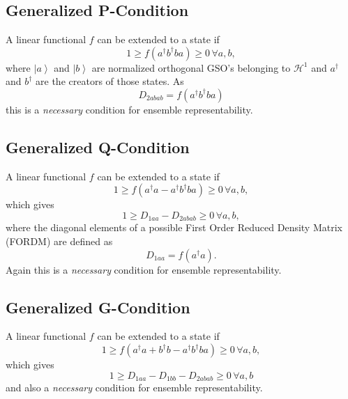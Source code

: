 \documentclass[aps,preprint]{revtex4}%
\begin{document}
\subsection{Generalized P-Condition}

A linear functional $f$ can be extended to a state if
\begin{equation}
1\geq f\left(  a^{\dagger}b^{\dagger}ba\right)  \geq0\,\forall a,b,
\end{equation}
where $\left\vert a\right\rangle $ and $\left\vert b\right\rangle $ are
normalized orthogonal GSO's belonging to $\mathcal{H}^{1}$ and $a^{\dagger}$
and $b^{\dagger}$ are the creators of those states. As
\begin{equation}
D_{2abab}=f\left(  a^{\dagger}b^{\dagger}ba\right)
\end{equation}
this is a \emph{necessary }condition for ensemble representability.

\subsection{Generalized Q-Condition}

A linear functional $f$ can be extended to a state if
\begin{equation}
1\geq f\left(  a^{\dagger}a-a^{\dagger}b^{\dagger}ba\right)  \geq0\,\forall
a,b,
\end{equation}
which gives
\begin{equation}
1\geq D_{1aa}-D_{2abab}\geq0\,\forall a,b, \label{Q1}%
\end{equation}
where the diagonal elements of a possible First Order Reduced Density Matrix
(FORDM) are defined as
\begin{equation}
D_{1aa}=f\left(  a^{\dagger}a\right)  .
\end{equation}
Again this is a \emph{necessary }condition for ensemble representability.

\subsection{Generalized G-Condition}

A linear functional $f$ can be extended to a state if
\begin{equation}
1\geq f\left(  a^{\dagger}a+b^{\dagger}b-a^{\dagger}b^{\dagger}ba\right)
\geq0\,\forall a,b,
\end{equation}
which gives
\begin{equation}
1\geq D_{1aa}-D_{1bb}-D_{2abab}\geq0\,\forall a,b \label{G1}%
\end{equation}
and also a \emph{necessary }condition for ensemble representability.
\end{document}
